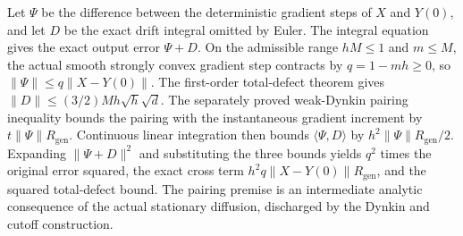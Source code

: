 \documentclass[11pt,a4paper]{report}
\begin{document}
Let \(\Psi\) be the difference between the deterministic gradient steps of \(X\) and \(Y(0)\), and let \(D\) be the exact drift integral omitted by Euler. The integral equation gives the exact output error \(\Psi +D\). On the admissible range \(hM\le1\) and \(m\le M\), the actual smooth strongly convex gradient step contracts by \(q=1-mh\ge 0\), so \(\|\Psi \|\le q\|X-Y(0)\|\). The first-order total-defect theorem gives \(\|D\|\le (3/2)Mh\sqrt h\sqrt d\). The separately proved weak-Dynkin pairing inequality bounds the pairing with the instantaneous gradient increment by \(t\|\Psi \|R_{\mathrm{gen}}\). Continuous linear integration then bounds \(\langle \Psi ,D\rangle\) by \(h^{2}\|\Psi \|R_{\mathrm{gen}}/2\). Expanding \(\|\Psi +D\|^{2}\) and substituting the three bounds yields \(q^{2}\) times the original error squared, the exact cross term \(h^{2}q\|X-Y(0)\|R_{\mathrm{gen}}\), and the squared total-defect bound. The pairing premise is an intermediate analytic consequence of the actual stationary diffusion, discharged by the Dynkin and cutoff construction.
\end{document}
